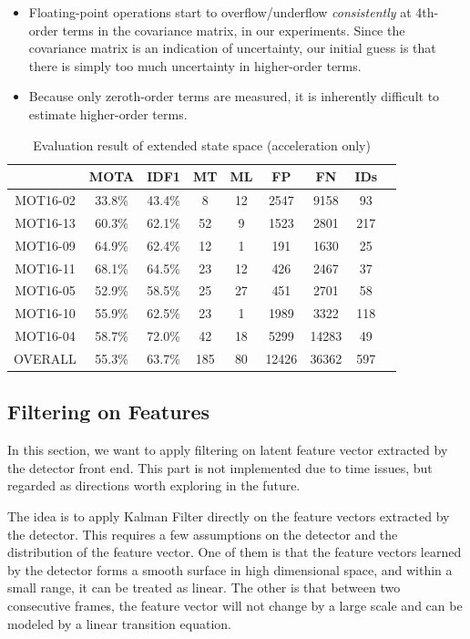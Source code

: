 \documentclass[conference]{IEEEtran}
\begin{document}
\begin{itemize}
    \item Floating-point operations start to overflow/underflow \emph{consistently} at 4th-order terms in the covariance matrix, in our experiments. Since the covariance matrix is an indication of uncertainty, our initial guess is that there is simply too much uncertainty in higher-order terms.
    \item Because only zeroth-order terms are measured, it is inherently difficult to estimate higher-order terms.
\end{itemize}

\linespread{1.2}
\begin{table}
    \caption{Evaluation result of extended state space (acceleration only)}
    \label{tab:extended-state-space}
    \begin{tabular}{ccccccccc}
        \hline
         & MOTA & IDF1 & MT & ML & FP & FN & IDs\\
        \hline
        MOT16-02 & 33.8\% & 43.4\% & 8 & 12 & 2547 & 9158 & 93\\
        MOT16-13 & 60.3\% & 62.1\% & 52 & 9 & 1523 & 2801 & 217\\
        MOT16-09 & 64.9\% & 62.4\% & 12 & 1 & 191 & 1630 & 25\\
        MOT16-11 & 68.1\% & 64.5\% & 23 & 12 & 426 & 2467 & 37\\
        MOT16-05 & 52.9\% & 58.5\% & 25 & 27 & 451 & 2701 & 58\\
        MOT16-10 & 55.9\% & 62.5\% & 23 & 1 & 1989 & 3322 & 118\\
        MOT16-04 & 58.7\% & 72.0\% & 42 & 18 & 5299 & 14283 & 49\\
        OVERALL & 55.3\% & 63.7\% & 185 & 80 & 12426 & 36362 & 597\\
        \hline
    \end{tabular}
\end{table}
\linespread{1}

\subsection{Filtering on Features}

In this section, we want to apply filtering on latent feature vector extracted by the detector front end. This part is not implemented due to time issues, but regarded as directions worth exploring in the future.

The idea is to apply Kalman Filter directly on the feature vectors extracted by the detector. This requires a few assumptions on the detector and the distribution of the feature vector. One of them is that the feature vectors learned by the detector forms a smooth surface in high dimensional space, and within a small range, it can be treated as linear.  The other is that between two consecutive frames, the feature vector will not change by a large scale and can be modeled by a linear transition equation.
\end{document}
